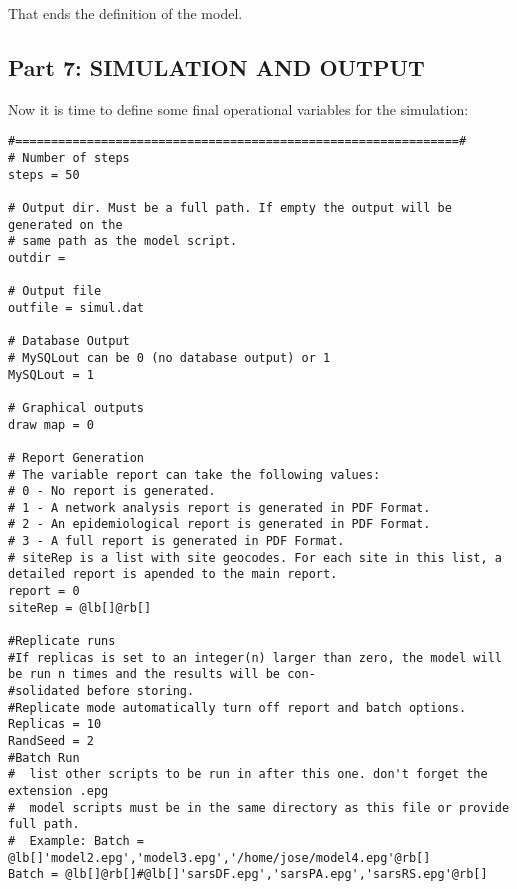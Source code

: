 \documentclass[a4paper,10pt]{manual}
\begin{document}
That ends the definition of the model.


\subsection{Part 7: SIMULATION AND OUTPUT}

Now it is time to define some final operational variables for the simulation:

\begin{Verbatim}[commandchars=@\[\]]
#==============================================================#
# Number of steps
steps = 50

# Output dir. Must be a full path. If empty the output will be generated on the
# same path as the model script.
outdir =

# Output file
outfile = simul.dat

# Database Output
# MySQLout can be 0 (no database output) or 1
MySQLout = 1

# Graphical outputs
draw map = 0

# Report Generation
# The variable report can take the following values:
# 0 - No report is generated.
# 1 - A network analysis report is generated in PDF Format.
# 2 - An epidemiological report is generated in PDF Format.
# 3 - A full report is generated in PDF Format.
# siteRep is a list with site geocodes. For each site in this list, a detailed report is apended to the main report.
report = 0
siteRep = @lb[]@rb[]

#Replicate runs
#If replicas is set to an integer(n) larger than zero, the model will be run n times and the results will be con-
#solidated before storing.
#Replicate mode automatically turn off report and batch options.
Replicas = 10
RandSeed = 2
#Batch Run
#  list other scripts to be run in after this one. don't forget the extension .epg
#  model scripts must be in the same directory as this file or provide full path.
#  Example: Batch = @lb[]'model2.epg','model3.epg','/home/jose/model4.epg'@rb[]
Batch = @lb[]@rb[]#@lb[]'sarsDF.epg','sarsPA.epg','sarsRS.epg'@rb[]
\end{Verbatim}
\end{document}
